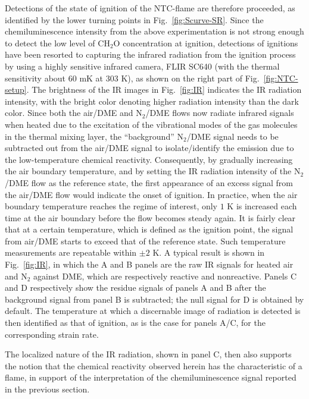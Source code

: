 Detections of the state of ignition of the NTC-flame are therefore proceeded, as identified by the lower turning points in Fig.~\ref{fig:Scurve-SR}.  Since the chemiluminescence intensity from the above experimentation is not strong enough to detect the low level of CH$_2$O concentration at ignition, detections of ignitions have been resorted to capturing the infrared radiation from the ignition process by using a highly sensitive infrared camera, FLIR SC640 (with the thermal sensitivity about $60$ mK at $303$ K), as shown on the right part of Fig.~\ref{fig:NTC-setup}.  The brightness of the IR images in Fig.~\ref{fig:IR} indicates the IR radiation intensity, with the bright color denoting higher radiation intensity than the dark color.  Since both the air/DME and N$_2$/DME flows now radiate infrared signals when heated due to the excitation of the vibrational modes of the gas molecules in the thermal mixing layer, the “background” N$_2$/DME signal needs to be subtracted out from the air/DME signal to isolate/identify the emission due to the low-temperature chemical reactivity.  Consequently, by gradually increasing the air boundary temperature, and by setting the IR radiation intensity of the N$_2$/DME flow as the reference state, the first appearance of an excess signal from the air/DME flow would indicate the onset of ignition.  In practice, when the air boundary temperature reaches the regime of interest, only $1$ K is increased each time at the air boundary before the flow becomes steady again.  It is fairly clear that at a certain temperature, which is defined as the ignition point, the signal from air/DME starts to exceed that of the reference state.  Such temperature measurements are repeatable within $\pm 2$ K.  A typical result is shown in Fig.~\ref{fig:IR}, in which the A and B panels are the raw IR signals for heated air and N$_2$ against DME, which are respectively reactive and nonreactive.  Panels C and D respectively show the residue signals of panels A and B after the background signal from panel B is subtracted; the null signal for D is obtained by default.  The temperature at which a discernable image of radiation is detected is then identified as that of ignition, as is the case for panels A/C, for the corresponding strain rate.

The localized nature of the IR radiation, shown in panel C, then also supports the notion that the chemical reactivity observed herein has the characteristic of a flame, in support of the interpretation of the chemiluminescence signal reported in the previous section.

